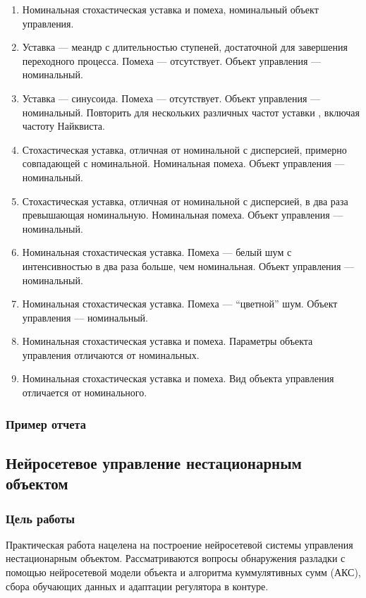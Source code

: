 \begin{enumerate}
\item Номинальная стохастическая уставка и помеха, номинальный объект
  управления.
\item Уставка --- меандр с длительностью ступеней, достаточной для
  завершения переходного процесса.  Помеха --- отсутствует.  Объект
  управления --- номинальный.
\item Уставка --- синусоида.  Помеха --- отсутствует.  Объект
  управления --- номинальный.  Повторить для нескольких различных
  частот уставки , включая частоту Найквиста.
\item Стохастическая уставка, отличная от номинальной с дисперсией,
  примерно совпадающей с номинальной.  Номинальная помеха.  Объект
  управления --- номинальный.
\item Стохастическая уставка, отличная от номинальной с дисперсией, в
  два раза превышающая номинальную.  Номинальная помеха.  Объект
  управления --- номинальный.
\item Номинальная стохастическая уставка.  Помеха --- белый шум с
  интенсивностью в два раза больше, чем номинальная.  Объект
  управления --- номинальный.
\item Номинальная стохастическая уставка.  Помеха --- ``цветной'' шум.
  Объект управления --- номинальный.
\item Номинальная стохастическая уставка и помеха.  Параметры объекта
  управления отличаются от номинальных.
\item Номинальная стохастическая уставка и помеха.  Вид объекта
  управления отличается от номинального.
\end{enumerate}

\subsubsection{Пример отчета}


\subsection{Нейросетевое управление нестационарным объектом}

\subsubsection{Цель работы}

Практическая работа нацелена на построение нейросетевой системы
управления нестационарным объектом.  Рассматриваются вопросы
обнаружения разладки с помощью нейросетевой модели объекта и алгоритма
куммулятивных сумм (АКС), сбора обучающих данных и адаптации
регулятора в контуре.

